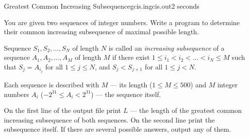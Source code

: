 \begin{problem}{Greatest Common Increasing Subsequence}{gcis.in}{gcis.out}{2 seconds}

You are given two sequences of integer numbers. 
Write a program to determine their common increasing subsequence of maximal 
possible length. 

Sequence $S_1, S_2, \ldots, S_N$ of length $N$ is called an
{\em increasing subsequence\/} of a sequence $A_1, A_2, \ldots, A_M$ of length $M$
if there exist $1 \le i_1 < i_2 < \ldots < i_N \le M$ such that 
$S_j = A_{i_j}$ for all $1 \le j \le N$, and $S_j < S_{j+1}$ for all $1 \le j < N$. 
                 
\InputFile

Each sequence is described with $M$ --- its length ($1 \le M \le 500$) and
$M$ integer numbers $A_i$ ($-2^{31} \le A_i < 2^{31}$) ---
the sequence itself. 

\OutputFile

On the first line of the output file print $L$ --- the length of the greatest
common increasing subsequence of both sequences. On the second line print the subsequence itself.
If there are several possible answers, output any of them.

\Example

\begin{example}[*]
%
\end{example}

\end{problem}
